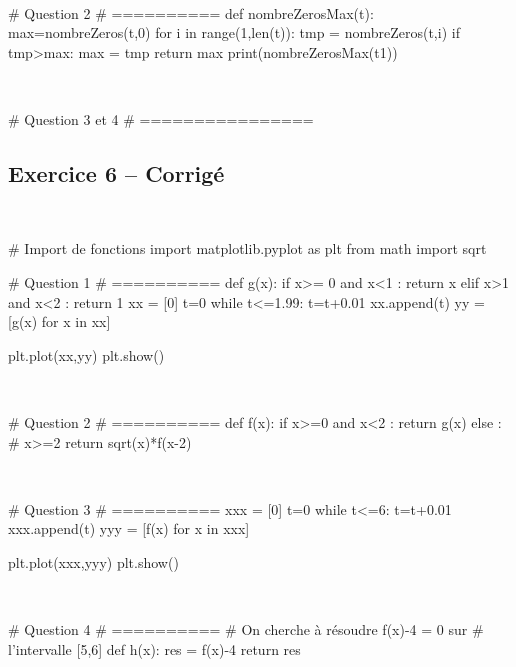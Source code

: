 \documentclass[10pt,fleqn]{article} %
\begin{document}
\begin{multicols}{2}
\begin{corrige}
$\quad$
\begin{python}
# Question 2
# ==========
def nombreZerosMax(t):
    max=nombreZeros(t,0)
    for i in range(1,len(t)):
        tmp = nombreZeros(t,i)
        if tmp>max:
            max = tmp
    return max
print(nombreZerosMax(t1))
\end{python}
\end{corrige}

\begin{corrige}
$\quad$
\begin{python}
# Question 3 et 4
# ================
\end{python}
\end{corrige}

\subsection*{Exercice 6 -- Corrigé}
\begin{corrige}
$\quad$
\begin{python}
# Import de fonctions
import matplotlib.pyplot as plt
from math import sqrt

# Question 1 
# ==========
def g(x):
    if x>= 0 and x<1 :
        return x
    elif x>1 and x<2 :
        return 1
xx = [0]
t=0
while t<=1.99:
    t=t+0.01
    xx.append(t)
yy = [g(x) for x in xx]

plt.plot(xx,yy)
plt.show()
\end{python}
\end{corrige}

\begin{corrige}
$\quad$
\begin{python}
# Question 2
# ==========
def f(x):
    if x>=0 and x<2 :
        return g(x)
    else : # x>=2
        return sqrt(x)*f(x-2)
\end{python}
\end{corrige}

\begin{corrige}
$\quad$
\begin{python}
# Question 3
# ==========
xxx = [0]
t=0
while t<=6:
    t=t+0.01
    xxx.append(t)
yyy = [f(x) for x in xxx]

plt.plot(xxx,yyy)
plt.show()
\end{python}
\end{corrige}

\begin{corrige}
$\quad$
\begin{python}
# Question 4
# ==========
# On cherche à résoudre f(x)-4 = 0 sur
# l'intervalle [5,6]
def h(x):
    res = f(x)-4
    return res


\end{python}
\end{corrige}
\end{multicols}
\end{document}
